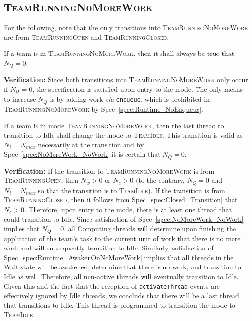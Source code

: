 \documentclass{article}
\newcommand{\TeamIdle}          {\textsc{TeamIdle}}
\newcommand{\TeamRunningOpen}   {\textsc{TeamRunningOpen}}
\newcommand{\TeamRunningClosed} {\textsc{TeamRunningClosed}}
\newcommand{\TeamRunningNoMoreWork} {\textsc{TeamRunningNoMoreWork}}
\begin{document}
\subsection{\TeamRunningNoMoreWork}
For the following, note that the only transitions into {\TeamRunningNoMoreWork}
are from {\TeamRunningOpen} and \TeamRunningClosed.

\begin{spec}
\label{spec:NoMoreWork_NoWork}
If a team is in \TeamRunningNoMoreWork, then it shall always be true that $N_Q =
0$.
\end{spec}
\textbf{Verification:}\hspace{0.125in}  
Since both transitions into {\TeamRunningNoMoreWork} only occur if $N_Q = 0$,
the specification is satisfied upon entry to the mode.  The only means to
increase $N_Q$ is by adding work \textit{via} \texttt{enqueue}, which is
prohibited in {\TeamRunningNoMoreWork} by Spec~\ref{spec:Runtime_NoEnqueue}.

\begin{spec}
\label{spec:NoMoreWork_TransitionToIdle}
If a team is in mode \TeamRunningNoMoreWork, then the last thread to transition
to Idle shall change the mode to \TeamIdle.  This transition is valid as $N_i =
N_{max}$ necessarily at the transition and by Spec~\ref{spec:NoMoreWork_NoWork}
it is certain that $N_Q = 0$.
\end{spec}
\textbf{Verification:}\hspace{0.125in}  If the transition to
{\TeamRunningNoMoreWork} is from \TeamRunningOpen, then $N_w > 0$ or $N_c > 0$
(to the contrary, $N_Q = 0$ and $N_i = N_{max}$ so that the transition is to
\TeamIdle).  If the transition is from \TeamRunningClosed, then it follows from
Spec~\ref{spec:Closed_Transition} that $N_c > 0$.  Therefore, upon entry to the
mode, there is at least one thread that could transition to Idle.  Since
satisfaction of Spec~\ref{spec:NoMoreWork_NoWork} implies that $N_Q = 0$, all
Computing threads will determine upon finishing the application of the team's
task to the current unit of work that there is no more work and will
subsequently transition to Idle.  Similarly, satisfaction of
Spec~\ref{spec:Runtime_AwakenOnNoMoreWork} implies that all threads in the Wait
state will be awakened, determine that there is no work, and transition to Idle
as well.  Therefore, all non-active threads will eventually transition to Idle.
Given this and the fact that the reception of \texttt{activateThread} events are
effectively ignored by Idle threads, we conclude that there will be a last
thread that transitions to Idle.  This thread is programmed to transition the
mode to \TeamIdle.
\end{document}
